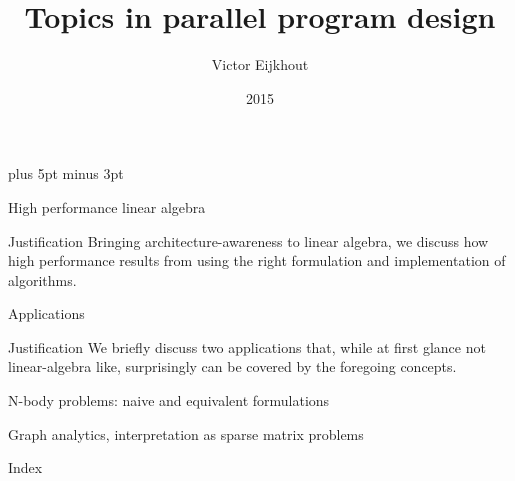 \documentclass[11pt,headernav]{beamer}
\begin{document}
\parskip=10pt plus 5pt minus 3pt

\title{Topics in parallel program design}
\author{Victor Eijkhout}
\date{2015}

\begin{frame}
  \titlepage
\end{frame}

 {High performance linear algebra}

\begin{frame}{Justification}
  Bringing architecture-awareness to linear algebra,
  we discuss how high performance results from
  using the right formulation and implementation of algorithms.
\end{frame}







 {Applications}

\begin{frame}{Justification}
  We briefly discuss two applications that,
  while at first glance not linear-algebra like, surprisingly 
  can be covered by the foregoing concepts.
\end{frame}

 {N-body problems: naive and equivalent formulations}
%


 {Graph analytics, interpretation as sparse matrix problems}



\newenvironment{theindex}{\begin{itemize}}{\end{itemize}}
\let\indexspace\par
\def\subitem{\par\indent}

\begin{frame}{Index}
\small
\begin{multicols}{2}
\printindex  
\end{multicols}
\end{frame}
\end{document}
